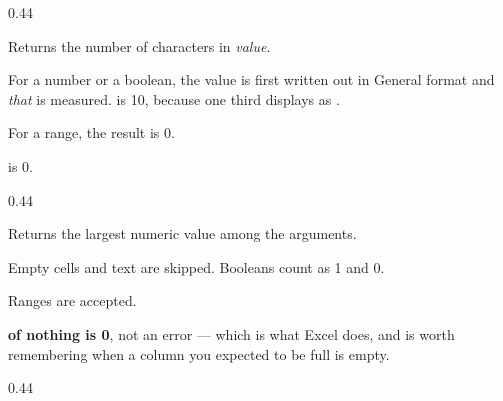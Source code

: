 \begin{ccexamples}{0.44\linewidth}
\end{ccexamples}


Returns the number of characters in \emph{value}.

\begin{ccsteps}
\item For a number or a boolean, the value is first written out in General
format and \emph{that} is measured.  is 10, because one third
displays as .
\item For a range, the result is 0.
\item {} is 0.
\end{ccsteps}

\begin{ccexamples}{0.44\linewidth}
\end{ccexamples}


Returns the largest numeric value among the arguments.

\begin{ccsteps}
\item Empty cells and text are skipped. Booleans count as 1 and 0.
\item Ranges are accepted.
\item \textbf{ of nothing is 0}, not an error --- which is what Excel
does, and is worth remembering when a column you expected to be full is empty.
\end{ccsteps}

\begin{ccexamples}{0.44\linewidth}
\end{ccexamples}


